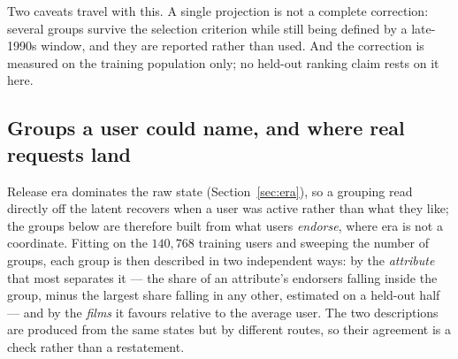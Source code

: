 \documentclass[11pt]{article}
\begin{document}
Two caveats travel with this. A single projection is not a complete correction: several groups
survive the selection criterion while still being defined by a late-1990s window, and they are
reported rather than used. And the correction is measured on the training population only; no
held-out ranking claim rests on it here.

\subsection{Groups a user could name, and where real requests land}
\label{sec:groups_named}
\label{sec:clusters}

Release era dominates the raw state (Section~\ref{sec:era}), so a grouping read directly off the
latent recovers when a user was active rather than what they like; the groups below are therefore
built from what users \emph{endorse}, where era is not a coordinate. Fitting on the $140{,}768$ training users
and sweeping the number of groups, each group is then described in two independent ways: by the
\emph{attribute} that most separates it --- the share of an attribute's endorsers falling inside the
group, minus the largest share falling in any other, estimated on a held-out half --- and by the
\emph{films} it favours relative to the average user. The two descriptions are produced from the
same states but by different routes, so their agreement is a check rather than a restatement.
\end{document}
